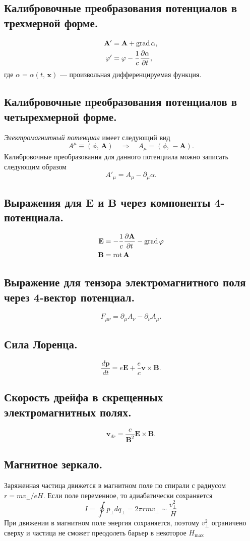 \documentclass[a4paper,12pt]{article}
\begin{document}
\subsection{Калибровочные преобразования потенциалов в трехмерной форме.}
\begin{align*}
	\mathbf{A}'&=\mathbf{A}+\operatorname{grad} \alpha,\\
	\varphi'&=\varphi-\frac{1}{c}\frac{\partial \alpha}{\partial t} 
,\end{align*}
где $\alpha=\alpha(t,\,\mathbf{x})$ --- произвольная дифференцируемая функция.
\subsection{Калибровочные преобразования потенциалов в четырехмерной форме.}
\emph{Электромагнитный  потенциал} имеет следующий вид
\[
	A^\mu\equiv(\phi,\,\mathbf{A})\quad \Rightarrow\quad A_\mu=(\phi,\,-\mathbf{A})
.\]
Калибровочные преобразования для данного потенциала можно записать следующим
образом
\[
A'_\mu=A_\mu-\partial_\mu \alpha
.\] 
\subsection{Выражения для $\mathbf{E}$ и $\mathbf{B}$ через компоненты 4-потенциала.}
\begin{align*}
	\mathbf{E}&=-\frac{1}{c}\frac{\partial \mathbf{A}}{\partial t} -
	\operatorname{grad} \varphi\\
	\mathbf{B}&=\operatorname{rot} \mathbf{A}
\end{align*}
\subsection{Выражение для тензора электромагнитного поля через 4-вектор
потенциал.}
\[
F_{\mu\nu}=\partial_\mu A_\nu -\partial_\nu A_\mu
.\] 
\subsection{Сила Лоренца.}
\[
\frac{d\mathbf{p}}{dt}=e \mathbf{E}+\frac{e}{c}\mathbf{v} \times
\mathbf{B} 
.\] 
\subsection{Скорость дрейфа в скрещенных электромагнитных полях.}
\[
	\mathbf{v}_{dr}=\frac{c}{\mathbf{B}^2}\mathbf{E}\times\mathbf{B}
.\] 
\subsection{Магнитное зеркало.}
Заряженная частица движется в магнитном поле по спирали с радиусом $r=mv_{\bot}/eH$. Если поле переменное, то адиабатически сохраняется 
\[I=\oint p_{\bot} dq_{\bot}=2\pi r m v_{\bot}\sim \frac{v_{\bot}^2}{H}\]
При движении в магнитном поле энергия сохраняется, поэтому $v_{\bot}^2$ ограничено сверху и частица не сможет преодолеть барьер в некоторое $H_{\max}$
\end{document}
